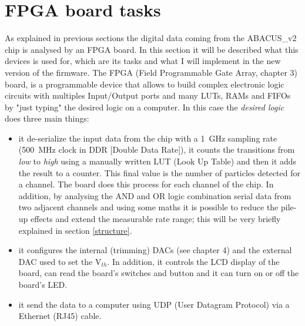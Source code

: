 \section{FPGA board tasks}
\noindent As explained in previous sections the digital data coming from the ABACUS\_v2 chip is analysed by an FPGA board. In this section it will be described what this devices is used for, which are its tasks and what I will implement in the new version of the firmware.
The FPGA (Field Programmable Gate Array, chapter 3) board, is a programmable device that allows to build complex electronic logic circuits with multiples Input/Output ports and many LUTs, RAMs and FIFOs by "just typing" the desired logic on a computer.
In this case the \textit{desired logic} does three main things: 
\begin{itemize}
	\item it de-serialize the input data from the chip with a 1~GHz sampling rate (500~MHz clock in DDR [Double Data Rate]), it counts the transitions from \textit{low} to \textit{high} using a manually written LUT (Look Up Table) and then it adds the result to a counter. This final value is the number of particles detected for a channel. The board does this process for each channel of the chip. In addition, by analysing the AND and OR logic combination serial data from two adjacent channels and using some maths it is possible to reduce the pile-up effects and extend the measurable rate range; this will be very briefly explained in section \ref{structure}.    
	\item it configures the internal (trimming) DACs (see chapter 4) and the external DAC used to set the V$_{th}$. In addition, it controls the LCD display of the board, can read the board's switches and button and it can turn on or off the board's LED. 
	\item it send the data to a computer using UDP (User Datagram Protocol) via a Ethernet (RJ45) cable.  
\end{itemize}
















